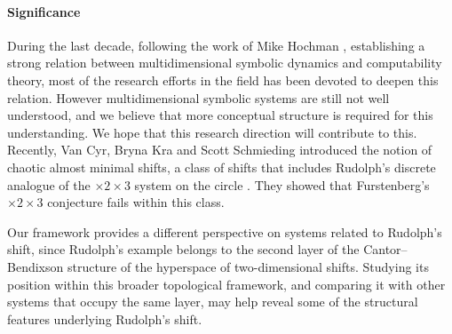 \documentclass{article}
\newcommand{\comm}[2]{\begin{tcolorbox}[colback=gray!40]\textbf{Comment} (#1) : #2\end{tcolorbox}}
\begin{document}


\paragraph{Significance} During the last decade, following the work of Mike Hochman \cite{HochmanMeyerovitch2010} \cite{Hochman2009}, establishing a strong relation between multidimensional symbolic dynamics and computability theory, most of the research efforts in the field has been devoted to deepen this relation. However multidimensional symbolic systems are still not well understood, and we believe that more conceptual structure is required for this understanding. We hope that this research direction will contribute to this. %
Recently, Van Cyr, Bryna Kra and Scott Schmieding \cite{CyrKraSchmieding_ChaoticAlmostMinimal} introduced the notion of chaotic almost minimal shifts, a class of shifts that includes Rudolph's discrete analogue of the $\times 2 \times 3$ system on the circle \cite{Rudolph1990}. They showed that Furstenberg's $\times 2 \times 3$ conjecture fails within this class.

Our framework provides a different perspective on systems related to Rudolph's shift, since Rudolph's example belongs to the second layer of the Cantor--Bendixson structure of the hyperspace of two-dimensional shifts. Studying its position within this broader topological framework, and comparing it with other systems that occupy the same layer, may help reveal some of the structural features underlying Rudolph's shift.

\end{document}

